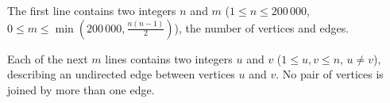 The first line contains two integers $n$ and $m$ ($1 \le n \le 200\,000$, $0 \le m \le \min(200\,000,\frac{n(n-1)}2)$), the number of vertices and edges.

Each of the next $m$ lines contains two integers $u$ and $v$ ($1 \le u,v \le n$, $u \ne v$), describing an undirected edge between vertices $u$ and $v$. No pair of vertices is joined by more than one edge.
